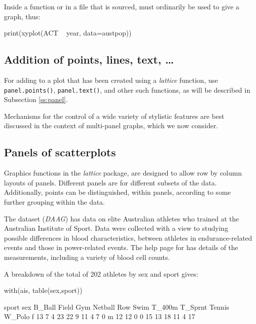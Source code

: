 Inside a function
or in a file that is sourced,  must
ordinarily be used to give a graph, thus:
\begin{Schunk}
\begin{Sinput}
print(xyplot(ACT ~ year, data=austpop))
\end{Sinput}
\end{Schunk}

\subsection*{Addition of points, lines, text, \ldots}
For adding
to a plot that has been created using a \textit{lattice} function,
use \verb!panel.points()!, \verb!panel.text()!, and other such
functions, as will be described in Subsection \ref{ss:panel}.

Mechanisms for the control of a wide variety of stylistic
features are best discussed in the context of multi-panel
graphs, which we now consider.

\subsection{Panels of scatterplots}

Graphics functions in the \textit{lattice} package, are designed to
allow row by column layouts of panels.  Different panels are for
different subsets of the data.  Additionally, points can be
distinguished, within panels, according to some further grouping
within the data.

The  dataset (\textit{DAAG}) has data on elite Australian
athletes who trained at the Australian Institute of Sport. Data were
collected with a view to studying possible differences in blood
characteristics, between athletes in endurance-related events and
those in power-related events.  The help page for  has
details of the measurements, including a variety of blood cell counts.

A breakdown of the total of 202 athletes by sex and sport gives:
\begin{fullwidth}
\begin{Schunk}
\begin{Sinput}
with(ais, table(sex,sport))
\end{Sinput}
\begin{Soutput}
   sport
sex B_Ball Field Gym Netball Row Swim T_400m T_Sprnt Tennis W_Polo
  f     13     7   4      23  22    9     11       4      7      0
  m     12    12   0       0  15   13     18      11      4     17
\end{Soutput}
\end{Schunk}
\end{fullwidth}
\noindent

